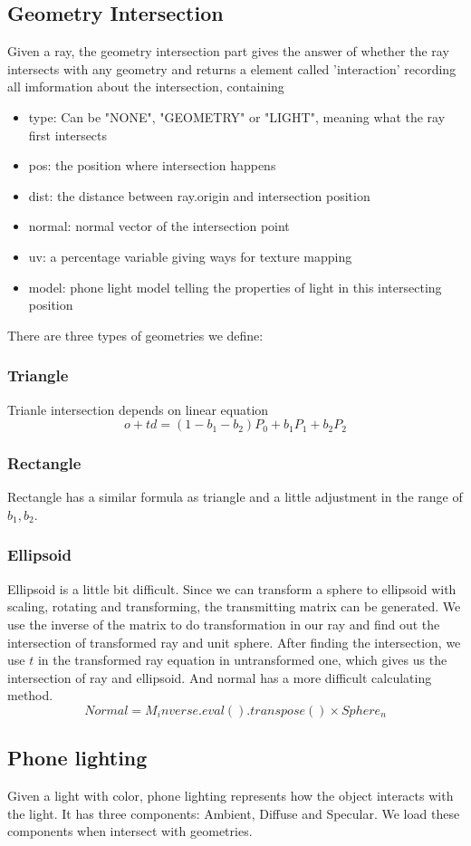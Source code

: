 \documentclass[acmtog]{acmart}
\begin{document}
\subsection{Geometry Intersection}
Given a ray, the geometry intersection part gives the answer of whether the ray intersects with any geometry and returns a element called 'interaction' recording all imformation about the intersection, containing
\begin{itemize}
	\item type: Can be "NONE", "GEOMETRY" or "LIGHT", meaning what the ray first intersects
	\item pos: the position where intersection happens
	\item dist: the distance between ray.origin and intersection position
	\item normal: normal vector of the intersection point
	\item uv: a percentage variable giving ways for texture mapping
	\item model: phone light model telling the properties of light in this intersecting position
\end{itemize}
There are three types of geometries we define:
\subsubsection{Triangle}
Trianle intersection depends on linear equation
$$o+td=(1-b_1-b_2)P_0+b_1P_1+b_2P_2$$
\subsubsection{Rectangle}
Rectangle has a similar formula as triangle and a little adjustment in the range of $b_1,b_2$.
\subsubsection{Ellipsoid}
Ellipsoid is a little bit difficult. Since we can transform a sphere to ellipsoid with scaling, rotating and transforming, the transmitting matrix can be generated. We use the inverse of the matrix to do transformation in our ray and find out the intersection of transformed ray and unit sphere. After finding the intersection, we use $t$ in the transformed ray equation in untransformed one, which gives us the intersection of ray and ellipsoid. And normal has a more difficult calculating method.
$$Normal = M_inverse.eval().transpose() \times Sphere_n$$
\subsection{Phone lighting}
Given a light with color, phone lighting represents how the object interacts with the light. It has three components: Ambient, Diffuse and Specular. We load these components when intersect with geometries.
\end{document}

